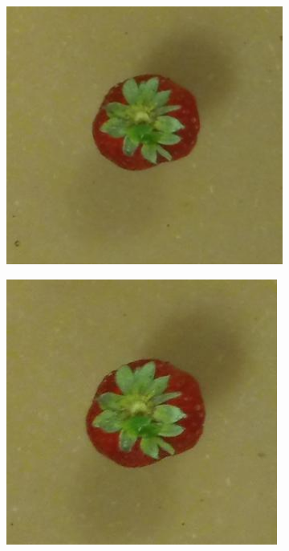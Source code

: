 \documentclass {udthesis}
\begin{document}
\begin{figure}
\begin{subfigure}[]{0.12\textwidth}
      \caption{}
  \end{subfigure}
  \begin{subfigure}[]{0.12\textwidth}
      \includegraphics[width=\textwidth]{strawberry4_obj_01/strawberry4_001_24}
      \caption{}
  \end{subfigure}
  \begin{subfigure}[]{0.12\textwidth}
      \includegraphics[width=\textwidth]{strawberry4_obj_01/strawberry4_001_22}

\end{subfigure}
\end{figure}
\end{document}
